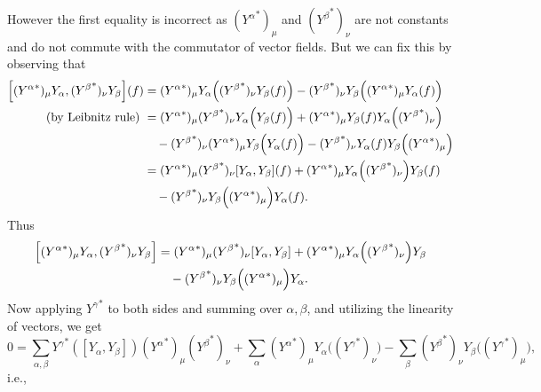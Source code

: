 \documentclass{note}
\numberwithin{equation}{chapter}
\begin{document}
However the first equality is incorrect as $({Y^\alpha}^*)_\mu$ and
$({Y^\beta}^*)_\nu$ are not constants and do not commute with the commutator of
vector fields. But we can fix this by observing that
\begin{align*}
    \left[({Y^\alpha}^*)_\mu Y_\alpha, ({Y^\beta}^*)_\nu Y_\beta\right](f)
     & = ({Y^\alpha}^*)_\mu Y_\alpha\prn{({Y^\beta}^*)_\nu Y_\beta(f)} -
    ({Y^\beta}^*)_\nu Y_\beta\Big(({Y^\alpha}^*)_\mu Y_\alpha(f)\Big)    \\
    \text{(by Leibnitz rule) }
     & =
    ({Y^\alpha}^*)_\mu ({Y^\beta}^*)_\nu Y_\alpha\Big(Y_\beta(f)\Big)
    + ({Y^\alpha}^*)_\mu Y_\beta(f) Y_\alpha\prn{({Y^\beta}^*)_\nu}      \\
     & \quad
    - ({Y^\beta}^*)_\nu ({Y^\alpha}^*)_\mu Y_\beta\Big(Y_\alpha(f)\Big)
    - ({Y^\beta}^*)_\nu Y_\alpha(f) Y_\beta\Big(({Y^\alpha}^*)_\mu\Big)  \\
     & =
    ({Y^\alpha}^*)_\mu ({Y^\beta}^*)_\nu [Y_\alpha, Y_\beta](f)
    + ({Y^\alpha}^*)_\mu Y_\alpha\prn{({Y^\beta}^*)_\nu} Y_\beta(f)      \\
     & \quad
    - ({Y^\beta}^*)_\nu Y_\beta\Big(({Y^\alpha}^*)_\mu\Big) Y_\alpha(f). \\
\end{align*}
Thus
\begin{align*}
    \left[({Y^\alpha}^*)_\mu Y_\alpha, ({Y^\beta}^*)_\nu Y_\beta\right]
     & = ({Y^\alpha}^*)_\mu ({Y^\beta}^*)_\nu [Y_\alpha, Y_\beta]
    + ({Y^\alpha}^*)_\mu Y_\alpha\prn{({Y^\beta}^*)_\nu} Y_\beta      \\
     & \quad
    - ({Y^\beta}^*)_\nu Y_\beta\Big(({Y^\alpha}^*)_\mu\Big) Y_\alpha. \\
\end{align*}
Now applying ${Y^\gamma}^*$ to both sides and summing over $\alpha, \beta$, and
utilizing the linearity of vectors, we get
\begin{equation*}
    0 = \sum_{\alpha,\beta}
    {Y^\gamma}^*([Y_\alpha, Y_\beta]) ({Y^\alpha}^*)_\mu({Y^\beta}^*)_\nu
    + \sum_\alpha ({Y^\alpha}^*)_\mu Y_\alpha\Big(({Y^\gamma}^*)_\nu\Big)
    - \sum_\beta ({Y^\beta}^*)_\nu Y_\beta\Big(({Y^\gamma}^*)_\mu\Big),
\end{equation*}
i.e.,
\end{document}
